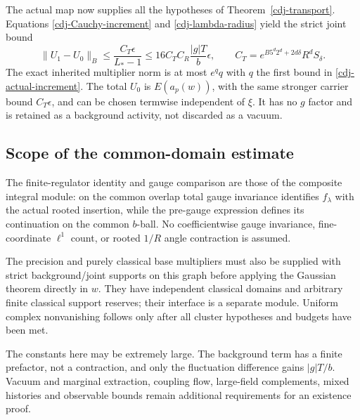 The actual map now supplies all the hypotheses of
Theorem~\ref{cdj-transport}. Equations
\eqref{cdj-Cauchy-increment} and
\eqref{cdj-lambda-radius} yield the strict joint bound
\begin{equation}\label{cdj-actual-increment}
 \|U_1-U_0\|_B
 \le\frac{C_T\epsilon}{L_*-1}
 \le16 C_T C_R\frac{|g|T}{b}\epsilon,\qquad
 C_T=e^{B5^d2^d+2d\delta}R^dS_\delta.
\end{equation}
The exact inherited multiplier norm is at most $e^q q$
with $q$ the first bound in
\eqref{cdj-actual-increment}. The total $U_0$ is
$E(a_p(w))$, with the same stronger carrier bound
$C_T\epsilon$, and can be chosen termwise independent
of $\xi$. It has no $g$ factor and is retained as a
background activity, not discarded as a vacuum.

\subsection{Scope of the common-domain estimate}
\label{cdj-scope}

The finite-regulator identity and gauge comparison are
those of the composite integral module: on the common
overlap total gauge invariance identifies
$f_\lambda$ with the actual rooted insertion, while
the pre-gauge expression defines its continuation on
the common $b$-ball. No coefficientwise gauge invariance,
fine-coordinate $\ell^1$ count, or rooted $1/R$ angle
contraction is assumed.

The precision and purely classical base multipliers
must also be supplied with strict background/joint
supports on this graph before applying the Gaussian
theorem directly in $w$. They have independent classical
domains and arbitrary finite classical support reserves;
their interface is a separate module. Uniform complex
nonvanishing follows only after all cluster hypotheses
and budgets have been met.

The constants here may be extremely large.
The background term has a finite prefactor, not a
contraction, and only the fluctuation difference gains
$|g|T/b$. Vacuum and marginal extraction, coupling flow,
large-field complements, mixed histories and observable
bounds remain additional requirements for an existence
proof.
